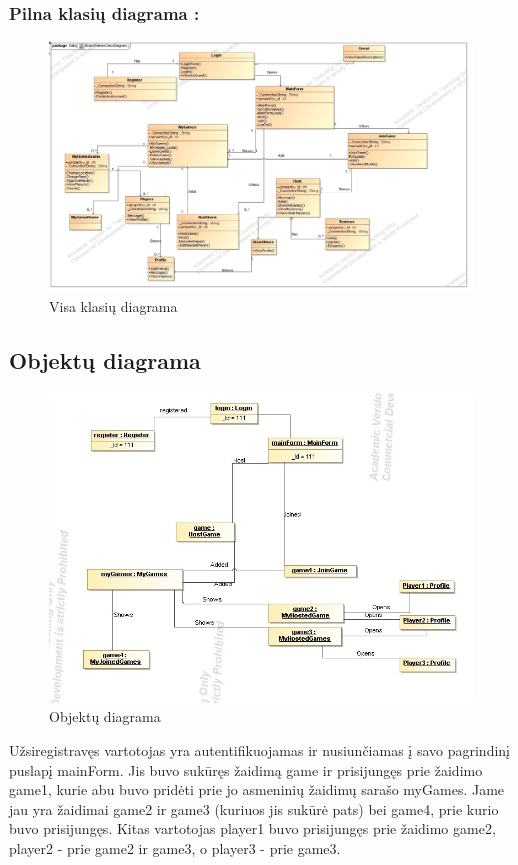 \documentclass{VUMIFPSkursinis}
\begin{document}
		\subsubsection*{Pilna klasių diagrama :}
			\begin{figure}[H]
				\centering
				\includegraphics[scale=0.3]{img/BoardGamesClassDiagramFull}
				\caption{Visa klasių diagrama}
				\label{img:BoardGamesClassDiagramFull}
			\end{figure}
	\subsection{Objektų diagrama}
		\begin{figure}[H]
				\centering
				\includegraphics[scale=0.5]{img/Object}
				\caption{Objektų diagrama}
				\label{img:Object}
			\end{figure}
		Užsiregistravęs vartotojas yra autentifikuojamas ir nusiunčiamas į savo pagrindinį puslapį mainForm. Jis buvo sukūręs žaidimą game ir prisijungęs prie žaidimo game1, kurie abu buvo pridėti prie jo asmeninių žaidimų sarašo myGames. Jame jau yra žaidimai game2 ir game3 (kuriuos jis sukūrė pats) bei game4, prie kurio buvo prisijungęs. Kitas vartotojas player1 buvo prisijungęs prie žaidimo game2, player2 - prie game2 ir game3, o player3 - prie game3.
\end{document}
